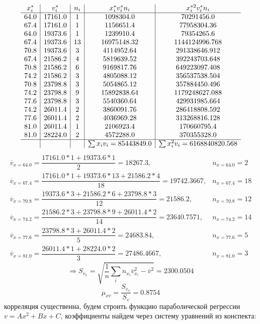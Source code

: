 \documentclass[9pt]{article}
\begin{document}
\[\begin{array}{c|c|c|c|c}
x_i^* & v_i^* & n_i & x_i^*v_i^*n_i & x_i^{*2}v_i^*n_i \\
\hline
64.0 & 17161.0 & 1 & 1098304.0 & 70291456.0\\
67.4 & 17161.0 & 1 & 1156651.4 & 77958304.36\\
64.0 & 19373.6 & 1 & 1239910.4 & 79354265.6\\
67.4 & 19373.6 & 13 & 16975148.32 & 1144124996.768\\
70.8 & 19373.6 & 3 & 4114952.64 & 291338646.912\\
67.4 & 21586.2 & 4 & 5819639.52 & 392243703.648\\
70.8 & 21586.2 & 6 & 9169817.76 & 649223097.408\\
74.2 & 21586.2 & 3 & 4805088.12 & 356537538.504\\
70.8 & 23798.8 & 3 & 5054865.12 & 357884450.496\\
74.2 & 23798.8 & 9 & 15892838.64 & 1179248627.088\\
77.6 & 23798.8 & 3 & 5540360.64 & 429931985.664\\
74.2 & 26011.4 & 2 & 3860091.76 & 286418808.592\\
77.6 & 26011.4 & 2 & 4036969.28 & 313268816.128\\
81.0 & 26011.4 & 1 & 2106923.4 & 170660795.4\\
81.0 & 28224.0 & 2 & 4572288.0 & 370355328.0\\
\hline
& & & \sum x_iv_i=85443849.0& \sum x_i^2v_i=6168840820.568
\end{array}\]
\[\begin{array}{rl}
    \overline{v}_{x=64.0}=\dfrac{17161.0*1+19373.6*1}{2}=18267.3, & n_{x=64.0}=2 \\
    \overline{v}_{x=67.4}=\dfrac{17161.0*1+19373.6*13+21586.2*4}{18}=19742.3667, & n_{x=67.4}=18 \\
    \overline{v}_{x=70.8}=\dfrac{19373.6*3+21586.2*6+23798.8*3}{12}=21586.2, & n_{x=70.8}=12 \\
    \overline{v}_{x=74.2}=\dfrac{21586.2*3+23798.8*9+26011.4*2}{14}=23640.7571, & n_{x=74.2}=14 \\
    \overline{v}_{x=77.6}=\dfrac{23798.8*3+26011.4*2}{5}=24683.84, & n_{x=77.6}=5 \\
    \overline{v}_{x=81.0}=\dfrac{26011.4*1+28224.0*2}{3}=27486.4667, & n_{x=81.0}=3
\end{array}\]
\[\Rightarrow S_{\overline{v}_x}=\sqrt{\dfrac{1}{n}\displaystyle\sum_i n_{x_i}\overline{v}_{x_i}^2-\overline{v}^2}=2300.0504\]
\[\mu_{xv}=\dfrac{S_{\overline{v}_x}}{S_v}=0.8754\]
корреляция существенна, будем строить функцию параболической регрессии \(v=Ax^2+Bx+C\), коэффициенты найдем через систему уравнений из конспекта:
\end{document}

